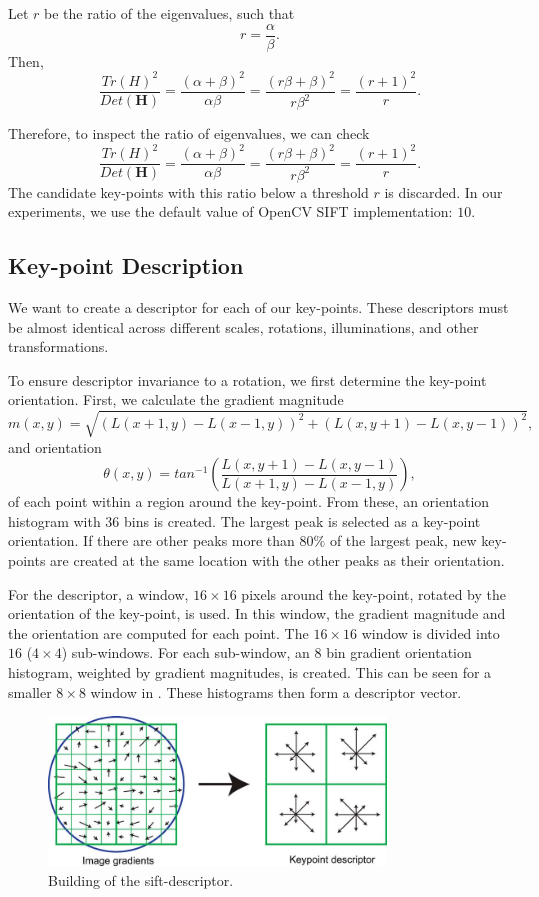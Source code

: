 Let $r$ be the ratio of the eigenvalues, such that
\begin{equation}
    r=\frac{\alpha}{\beta}.
\end{equation}
Then,
\begin{equation}
    \frac{Tr(H)^2}{Det(\boldsymbol{H})} = \frac{(\alpha+\beta)^2}{\alpha\beta}=\frac{(r\beta+\beta)^2}{r\beta^2} = \frac{(r+1)^2}{r}.
\end{equation}

Therefore, to inspect the ratio of eigenvalues, we can check
\begin{equation}
    \frac{Tr(H)^2}{Det(\boldsymbol{H})} = \frac{(\alpha+\beta)^2}{\alpha\beta}=\frac{(r\beta+\beta)^2}{r\beta^2} = \frac{(r+1)^2}{r}.
\end{equation}
The candidate key-points with this ratio below a threshold $r$ is discarded. In our experiments, we use the default value of OpenCV SIFT implementation: $10$.

\subsection{Key-point Description}
We want to create a descriptor for each of our key-points. These descriptors must be almost identical across different scales, rotations, illuminations, and other transformations.

To ensure descriptor invariance to a rotation, we first determine the key-point orientation. First, we calculate the gradient magnitude
\begin{equation}
    m(x,y) = \sqrt{(L(x+1,y)-L(x-1,y))^2+(L(x,y+1)-L(x,y-1))^2},
\end{equation}
and orientation
\begin{equation}
    \theta(x,y) = tan^{-1}\left(\frac{L(x,y+1)-L(x,y-1)}{L(x+1,y)-L(x-1,y)}\right),
\end{equation}
of each point within a region around the key-point. From these, an orientation histogram with $36$ bins is created. The largest peak is selected as a key-point orientation. If there are other peaks more than $80\%$ of the largest peak, new key-points are created at the same location with the other peaks as their orientation.

For the descriptor, a window, $16\times16$ pixels around the key-point, rotated by the orientation of the key-point, is used. In this window, the gradient magnitude and the orientation are computed for each point. The $16\times16$ window is divided into $16$ ($4\times4$) sub-windows. For each sub-window, an $8$ bin gradient orientation histogram, weighted by gradient magnitudes, is created. This can be seen for a smaller $8\times8$ window in . These histograms then form a descriptor vector.

\begin{figure}
    \centering
    \includegraphics[width=0.8\textwidth]{Figures/sift/descriptor.jpg}
    \caption[Extracting the sift-descriptor.]{Building of the sift-descriptor. \cite{Lowe2004}}
    \label{fig:sift_descriptor}
\end{figure}
